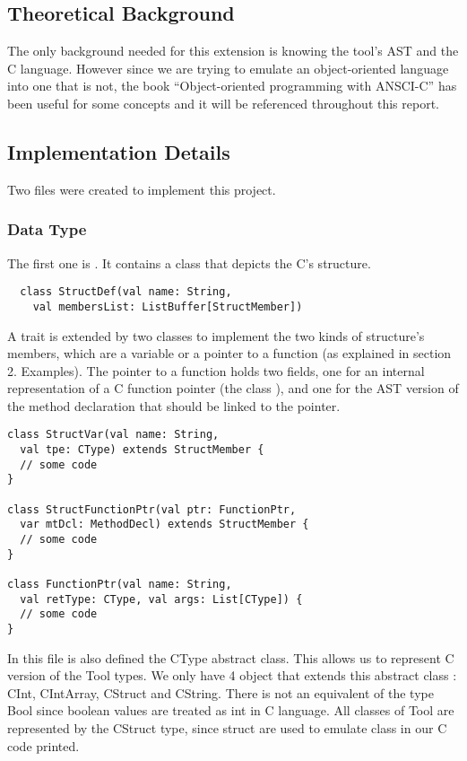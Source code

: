 \subsection{Theoretical Background}
The only background needed for this extension is knowing the tool's AST and the C language.
However since we are trying to emulate an object-oriented language into one that is not,
the book ``Object-oriented programming with ANSCI-C''\cite{oopBook}
has been useful for some concepts and it will be referenced throughout this report.

\subsection{Implementation Details}
Two files were created to implement this project.
\subsubsection{Data Type}
The first one is . It contains a class that depicts the C's structure.
\lstset{style=customscala}
\begin{lstlisting}
  class StructDef(val name: String,
    val membersList: ListBuffer[StructMember])
\end{lstlisting}
 A trait  is extended by two classes to implement the two kinds of structure's members,
 which are a variable or a pointer to a function (as explained in section 2. Examples).
 The pointer to a function holds two fields, one for an internal representation of a C function pointer (the class ),
 and one for the AST version of the method declaration that should be linked to the pointer.

 \begin{lstlisting}
class StructVar(val name: String,
  val tpe: CType) extends StructMember {
  // some code
}

class StructFunctionPtr(val ptr: FunctionPtr,
  var mtDcl: MethodDecl) extends StructMember {
  // some code
}

class FunctionPtr(val name: String,
  val retType: CType, val args: List[CType]) {
  // some code
}
 \end{lstlisting}
In this file is also defined the CType abstract class. This allows us to represent C version of the Tool types. We only have 4 object that extends this abstract class : CInt, CIntArray, CStruct and CString. There is not an equivalent of the type Bool since boolean values are treated as int in C language. All classes of Tool are represented by the CStruct type, since struct are used to emulate class in our C code printed.

